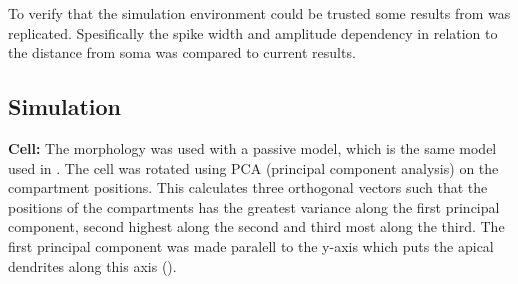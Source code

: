 \documentclass[altfont, fleqn]{uiophd}
\renewcommand{\cref}[1]{{\color{viridis_03}\mycref{#1}}}
\begin{document}
%
To verify that the simulation environment could be trusted 
some results from 
\textcite{pettersen_amplitude_2008} was replicated.
Spesifically the spike width and amplitude dependency in relation to 
the distance from soma was compared to current results. 

\subsection{Simulation}
\textbf{Cell:}
The \textcite{mainen_influence_1996} morphology was used with a passive model, which is 
the same model used in \textcite{pettersen_amplitude_2008}. 
The cell was rotated using PCA (principal component analysis) on the compartment
positions.
This calculates three orthogonal vectors such that 
the positions of the compartments 
has the greatest variance along the first principal component, 
second highest along the second and third most along the third.
The first principal component was made paralell to the y-axis which
puts the apical dendrites along this axis
(\cref{fig:4_1_morph}).
\\
\end{document}
